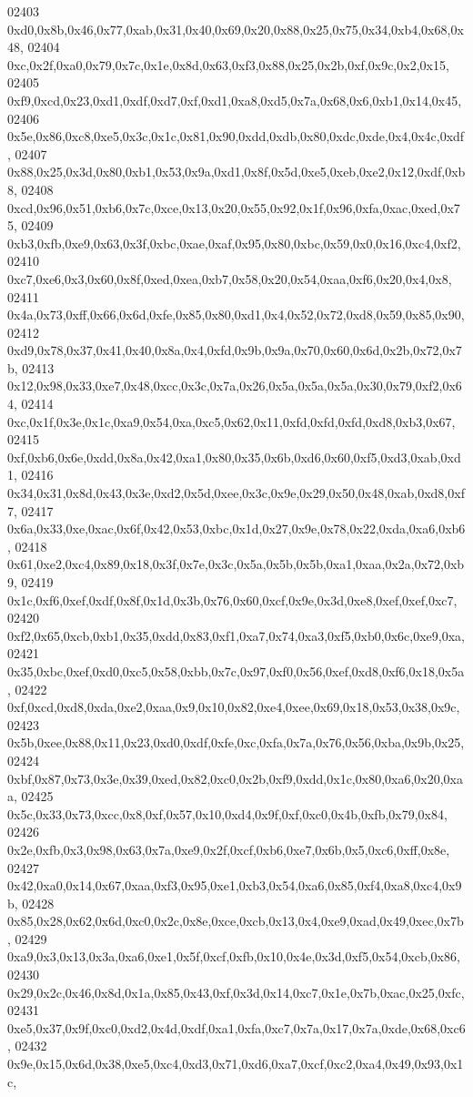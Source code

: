 \begin{DoxyCode}
02403   0xd0,0x8b,0x46,0x77,0xab,0x31,0x40,0x69,0x20,0x88,0x25,0x75,0x34,0xb4,0x68,0x48,
02404   0xc,0x2f,0xa0,0x79,0x7c,0x1e,0x8d,0x63,0xf3,0x88,0x25,0x2b,0xf,0x9c,0x2,0x15,
02405   0xf9,0xcd,0x23,0xd1,0xdf,0xd7,0xf,0xd1,0xa8,0xd5,0x7a,0x68,0x6,0xb1,0x14,0x45,
02406   0x5e,0x86,0xc8,0xe5,0x3c,0x1c,0x81,0x90,0xdd,0xdb,0x80,0xdc,0xde,0x4,0x4c,0xdf,
02407   0x88,0x25,0x3d,0x80,0xb1,0x53,0x9a,0xd1,0x8f,0x5d,0xe5,0xeb,0xe2,0x12,0xdf,0xb8,
02408   0xcd,0x96,0x51,0xb6,0x7c,0xce,0x13,0x20,0x55,0x92,0x1f,0x96,0xfa,0xac,0xed,0x75,
02409   0xb3,0xfb,0xe9,0x63,0x3f,0xbc,0xae,0xaf,0x95,0x80,0xbc,0x59,0x0,0x16,0xc4,0xf2,
02410   0xc7,0xe6,0x3,0x60,0x8f,0xed,0xea,0xb7,0x58,0x20,0x54,0xaa,0xf6,0x20,0x4,0x8,
02411   0x4a,0x73,0xff,0x66,0x6d,0xfe,0x85,0x80,0xd1,0x4,0x52,0x72,0xd8,0x59,0x85,0x90,
02412   0xd9,0x78,0x37,0x41,0x40,0x8a,0x4,0xfd,0x9b,0x9a,0x70,0x60,0x6d,0x2b,0x72,0x7b,
02413   0x12,0x98,0x33,0xe7,0x48,0xcc,0x3c,0x7a,0x26,0x5a,0x5a,0x5a,0x30,0x79,0xf2,0x64,
02414   0xc,0x1f,0x3e,0x1c,0xa9,0x54,0xa,0xc5,0x62,0x11,0xfd,0xfd,0xfd,0xd8,0xb3,0x67,
02415   0xf,0xb6,0x6e,0xdd,0x8a,0x42,0xa1,0x80,0x35,0x6b,0xd6,0x60,0xf5,0xd3,0xab,0xd1,
02416   0x34,0x31,0x8d,0x43,0x3e,0xd2,0x5d,0xee,0x3c,0x9e,0x29,0x50,0x48,0xab,0xd8,0xf7,
02417   0x6a,0x33,0xe,0xac,0x6f,0x42,0x53,0xbc,0x1d,0x27,0x9e,0x78,0x22,0xda,0xa6,0xb6,
02418   0x61,0xe2,0xc4,0x89,0x18,0x3f,0x7e,0x3c,0x5a,0x5b,0x5b,0xa1,0xaa,0x2a,0x72,0xb9,
02419   0x1c,0xf6,0xef,0xdf,0x8f,0x1d,0x3b,0x76,0x60,0xcf,0x9e,0x3d,0xe8,0xef,0xef,0xc7,
02420   0xf2,0x65,0xcb,0xb1,0x35,0xdd,0x83,0xf1,0xa7,0x74,0xa3,0xf5,0xb0,0x6c,0xe9,0xa,
02421   0x35,0xbc,0xef,0xd0,0xc5,0x58,0xbb,0x7c,0x97,0xf0,0x56,0xef,0xd8,0xf6,0x18,0x5a,
02422   0xf,0xcd,0xd8,0xda,0xe2,0xaa,0x9,0x10,0x82,0xe4,0xee,0x69,0x18,0x53,0x38,0x9c,
02423   0x5b,0xee,0x88,0x11,0x23,0xd0,0xdf,0xfe,0xc,0xfa,0x7a,0x76,0x56,0xba,0x9b,0x25,
02424   0xbf,0x87,0x73,0x3e,0x39,0xed,0x82,0xc0,0x2b,0xf9,0xdd,0x1c,0x80,0xa6,0x20,0xaa,
02425   0x5c,0x33,0x73,0xcc,0x8,0xf,0x57,0x10,0xd4,0x9f,0xf,0xc0,0x4b,0xfb,0x79,0x84,
02426   0x2e,0xfb,0x3,0x98,0x63,0x7a,0xe9,0x2f,0xcf,0xb6,0xe7,0x6b,0x5,0xc6,0xff,0x8e,
02427   0x42,0xa0,0x14,0x67,0xaa,0xf3,0x95,0xe1,0xb3,0x54,0xa6,0x85,0xf4,0xa8,0xc4,0x9b,
02428   0x85,0x28,0x62,0x6d,0xc0,0x2c,0x8e,0xce,0xcb,0x13,0x4,0xe9,0xad,0x49,0xec,0x7b,
02429   0xa9,0x3,0x13,0x3a,0xa6,0xe1,0x5f,0xcf,0xfb,0x10,0x4e,0x3d,0xf5,0x54,0xcb,0x86,
02430   0x29,0x2c,0x46,0x8d,0x1a,0x85,0x43,0xf,0x3d,0x14,0xc7,0x1e,0x7b,0xac,0x25,0xfc,
02431   0xe5,0x37,0x9f,0xc0,0xd2,0x4d,0xdf,0xa1,0xfa,0xc7,0x7a,0x17,0x7a,0xde,0x68,0xc6,
02432   0x9e,0x15,0x6d,0x38,0xe5,0xc4,0xd3,0x71,0xd6,0xa7,0xcf,0xc2,0xa4,0x49,0x93,0x1c,

\end{DoxyCode}
